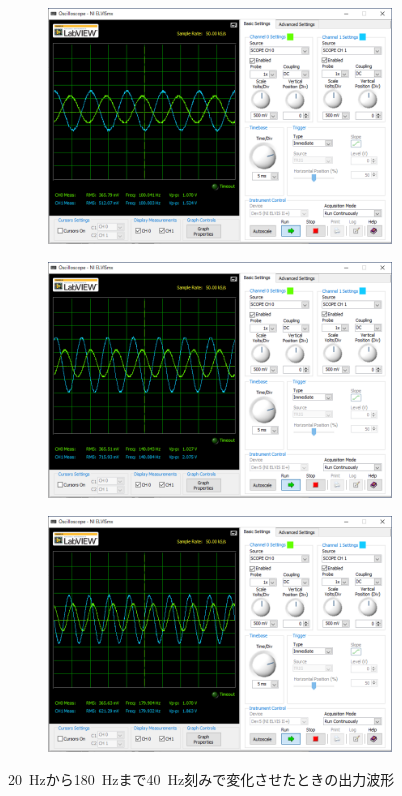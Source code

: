 \begin{figure}
	\centering
	\begin{subfigure}{0.8\linewidth}
		\centering
		\includegraphics[width=0.8\linewidth]{src/figures/exp10/20k-100hz-sin.png}
		\label{fig:exp10-100hz}
	\end{subfigure}
	\begin{subfigure}{0.8\linewidth}
		\centering
		\includegraphics[width=0.8\linewidth]{src/figures/exp10/20k-140hz-sin.png}
		\label{fig:exp10-140hz}
	\end{subfigure}
\end{figure}
\begin{figure}
	\centering
	\begin{subfigure}{0.8\linewidth}
		\addtocounter{subfigure}{4}
		\centering
		\includegraphics[width=0.8\linewidth]{src/figures/exp10/20k-180hz-sin.png}
		\label{fig:exp10-180hz}
	\end{subfigure}
	\caption{\SI{20}{Hz}から\SI{180}{Hz}まで\SI{40}{Hz}刻みで変化させたときの出力波形}\label{fig:exp10-band-sin}
\end{figure}
